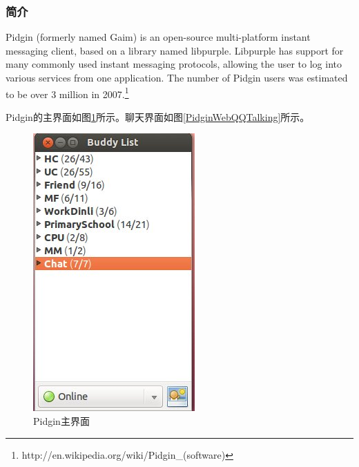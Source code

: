 \documentclass[paper=a4,fontsize=11pt]{article}
\begin{document}
	\subsubsection{简介}
	
	Pidgin (formerly named Gaim) is an open-source multi-platform instant messaging client, based on a library named libpurple. Libpurple has support for many commonly used instant messaging protocols, allowing the user to log into various services from one application.
	The number of Pidgin users was estimated to be over 3 million in 2007.\footnote{http://en.wikipedia.org/wiki/Pidgin\_(software)}
	
	Pidgin的主界面如图\ref{PidginWebQQMainUI}所示。聊天界面如图\ref{PidginWebQQTalking}所示。
	\begin{figure}[htbp]
		\centering
		\includegraphics[scale=0.8]{PidginWebQQMainUI.jpeg}
		\caption{Pidgin主界面}
		\label{PidginWebQQMainUI}
	\end{figure}
	
\end{document}
